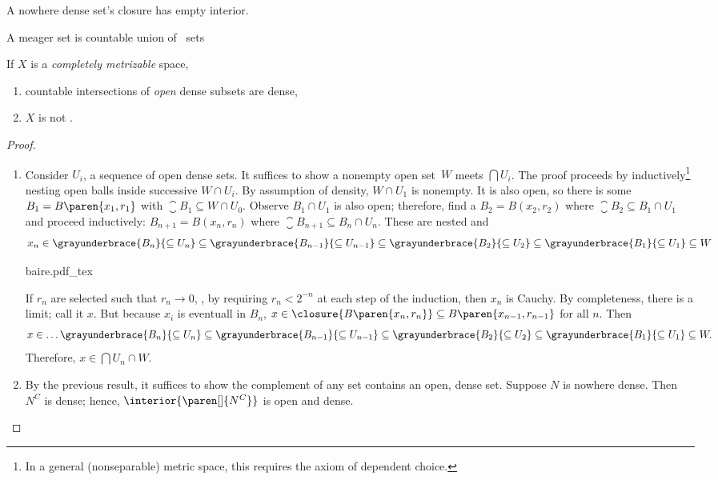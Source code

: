 \documentclass{scrartcl}
\newcommand{\ball}{B}
\begin{document}
\begin{defn}\label{nowhere-dense}
  A nowhere dense set's closure has empty interior.
\end{defn}
\begin{defn}[meager]\label{meager}
  A meager set is countable union of ~sets
\end{defn}
\begin{theorem}\label{baire category}
  If \(X\) is a \emph{completely metrizable} space,
  \begin{enumerate}
  \item countable intersections of \emph{open} dense subsets are dense,
  \item \(X\) is not .
  \end{enumerate}
\end{theorem}
\begin{proof} \
  \begin{enumerate}
  \item
    Consider \(U_i\), a sequence of open dense sets. It suffices to show a nonempty open set~\(W\)
    meets \(\bigcap U_i\). The proof proceeds by inductively\footnote{In a general (nonseparable) metric space, this requires the axiom of dependent choice.} nesting open balls inside successive \(W\cap U_i\). By assumption of density, \(W\cap U_1\) is nonempty. It is also open, so there is some \(\ball_1= \ball\paren{x_1,r_1}\) with \(\closure{\ball_1}\subseteq W\cap U_0\). Observe \(\ball_1\cap U_1\) is also open; therefore, find a \(\ball_2=\ball(x_2,r_2)\) where \(\closure{\ball_2}\subseteq \ball_1\cap U_1\) and proceed inductively: \(\ball_{n+1}=\ball(x_{n},r_{n})\) where \(\closure{\ball_{n+1}}\subseteq \ball_n\cap U_n\). These are nested and
    \[
      x_n \in \grayunderbrace{\ball_n}{\subseteq U_n}\subseteq \grayunderbrace{\ball_{n-1}}{\subseteq U_{n-1}} \subseteq  \grayunderbrace{\ball_2}{\subseteq U_2} \subseteq \grayunderbrace{\ball_1}{\subseteq U_1} \subseteq W
    \]
    \begin{center}
      {baire.pdf_tex}
    \end{center}
    If \(r_n\) are selected such that \(r_n\to 0\), \eg, by requiring \(r_n < 2^{-n}\) at each step of the induction,
    then \(x_n\) is Cauchy. By completeness, there is a limit; call it \(x\). But because \(x_i\) is eventuall in \(\ball_n\), \(x\in \closure{\ball\paren{x_n,r_n}}\subseteq \ball\paren{x_{n-1},r_{n-1}}\) for all \(n\). Then
    \[
      x \in \dots \grayunderbrace{\ball_n}{\subseteq U_n}\subseteq \grayunderbrace{\ball_{n-1}}{\subseteq U_{n-1}} \subseteq  \grayunderbrace{\ball_2}{\subseteq U_2} \subseteq \grayunderbrace{\ball_1}{\subseteq U_1} \subseteq W.
    \]
    Therefore, \(x\in \bigcap U_n\cap W\).
  \item By the previous result, it suffices to show the complement of any  set contains an open, dense set.
    Suppose \(N\) is nowhere dense. Then \(N^C\) is dense; hence, \(\interior{\paren[]{N^C}}\) is open and dense.
  \end{enumerate}
\end{proof}
\end{document}
